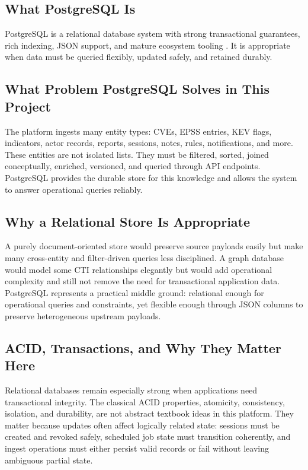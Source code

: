 \subsection{What PostgreSQL Is}
PostgreSQL is a relational database system with strong transactional guarantees, rich indexing, JSON support, and mature ecosystem tooling \cite{postgresql_docs}. It is appropriate when data must be queried flexibly, updated safely, and retained durably.

\subsection{What Problem PostgreSQL Solves in This Project}
The platform ingests many entity types: CVEs, EPSS entries, KEV flags, indicators, actor records, reports, sessions, notes, rules, notifications, and more. These entities are not isolated lists. They must be filtered, sorted, joined conceptually, enriched, versioned, and queried through API endpoints. PostgreSQL provides the durable store for this knowledge and allows the system to answer operational queries reliably.

\subsection{Why a Relational Store Is Appropriate}
A purely document-oriented store would preserve source payloads easily but make many cross-entity and filter-driven queries less disciplined. A graph database would model some CTI relationships elegantly but would add operational complexity and still not remove the need for transactional application data. PostgreSQL represents a practical middle ground: relational enough for operational queries and constraints, yet flexible enough through JSON columns to preserve heterogeneous upstream payloads.

\subsection{ACID, Transactions, and Why They Matter Here}
Relational databases remain especially strong when applications need transactional integrity. The classical ACID properties, atomicity, consistency, isolation, and durability, are not abstract textbook ideas in this platform. They matter because updates often affect logically related state: sessions must be created and revoked safely, scheduled job state must transition coherently, and ingest operations must either persist valid records or fail without leaving ambiguous partial state.

